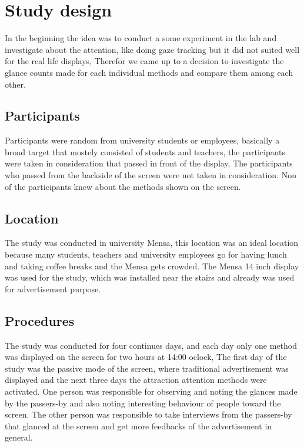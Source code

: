 \section{Study design}

In the beginning the idea was to conduct a some experiment in the lab and investigate about the attention, like doing gaze tracking but it did not suited well for the real life displays, Therefor we came up to a decision to investigate the glance counts made for each individual methods and compare them among each other. 

\subsection{Participants}
Participants were random from university students or employees, basically a broad target that mostely consisted of students and teachers, the participants were taken in consideration that passed in front of the display, The participants who passed from the backside of the screen were not taken in consideration. Non of the participants knew about the methods shown on the screen.

\subsection{Location}
The study was conducted in university Mensa, this location was an ideal location because many students, teachers and university employees go for having lunch and taking coffee breaks and the Mensa gets crowded. The Mensa 14 inch display was used for the study, which was installed near the stairs and already was used for advertisement purpose.

\subsection{Procedures}
The study was conducted for four continues days, and each day only one method was displayed on the screen for two hours at 14:00 oclock, The first day of the study was the passive mode of the screen, where traditional advertisement was displayed and the next three days the attraction attention methods were activated.
One person was responsible for observing and noting the glances made by the passers-by and also noting interesting behaviour of people toward the screen. The other person was responsible to take interviews from the passers-by that glanced at the screen and get more feedbacks of the advertisement in general.

